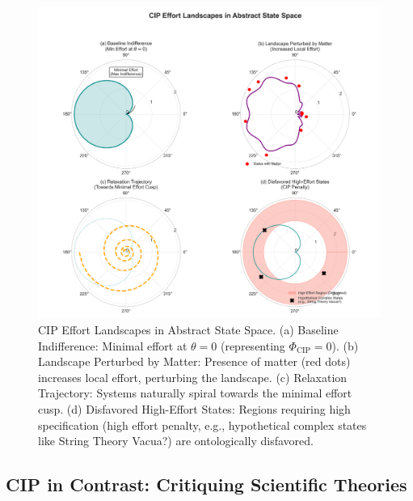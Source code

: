 \documentclass[11pt, a4paper]{article}
\newcommand{\subt}[1]{\mathrm{#1}}
\begin{document}
\begin{figure}[H]
    \centering
    \includegraphics[width=\textwidth]{CIP_StateSpace.png}
    \caption[CIP Effort Landscapes in Abstract State Space]{CIP Effort Landscapes in Abstract State Space. (a) Baseline Indifference: Minimal effort at $\theta=0$ (representing $\Phi_{\subt{CIP}}=0$). (b) Landscape Perturbed by Matter: Presence of matter (red dots) increases local effort, perturbing the landscape. (c) Relaxation Trajectory: Systems naturally spiral towards the minimal effort cusp. (d) Disfavored High-Effort States: Regions requiring high specification (high effort penalty, e.g., hypothetical complex states like String Theory Vacua?) are ontologically disfavored.}
    \label{fig:state_space}
\end{figure}

\subsection{CIP in Contrast: Critiquing Scientific Theories}
\end{document}
